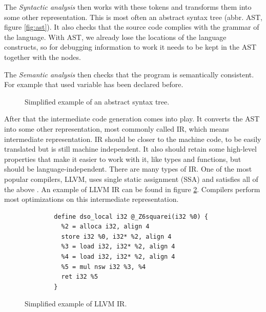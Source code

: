 The \textit{Syntactic analysis} then works with these tokens and transforms
them into some other representation. This is most often an abstract syntax tree
(abbr. AST, figure \ref{fig:ast}). It also checks that the source code complies
with the grammar of the language. With AST, we already lose the locations
of the language constructs, so for debugging information to work it needs
to be kept in the AST together with the nodes.

The \textit{Semantic analysis} then checks that the program is semantically
consistent. For example that used variable has been declared before.

\begin{figure}\label{fig:ast}
    \centering
    \caption{Simplified example of an abstract syntax tree.}
    \label{fig:astgraph}
\end{figure}
 
After that the intermediate code generation comes into play. It converts the
AST into some other representation, most commonly called IR, which means
intermediate representation. IR should be closer to the machine code, to be
easily translated but is still machine independent. It also should retain some
high-level properties that make it easier to work with it, like types and
functions, but should be language-independent. There are many types of IR. One
of the most popular compilers, LLVM, uses single static assignment (SSA) and
satisfies all of the above \cite{llvm}. An example of LLVM IR can be found in
figure \ref{fig:llvm-ir-example}. Compilers perform most optimizations on this
intermediate representation. 

\begin{figure}
    \begin{verbatim}
        define dso_local i32 @_Z6squarei(i32 %0) {
          %2 = alloca i32, align 4
          store i32 %0, i32* %2, align 4
          %3 = load i32, i32* %2, align 4
          %4 = load i32, i32* %2, align 4
          %5 = mul nsw i32 %3, %4
          ret i32 %5
        }
    \end{verbatim}
    \caption{Simplified example of LLVM IR.}
    \label{fig:llvm-ir-example}
\end{figure}

